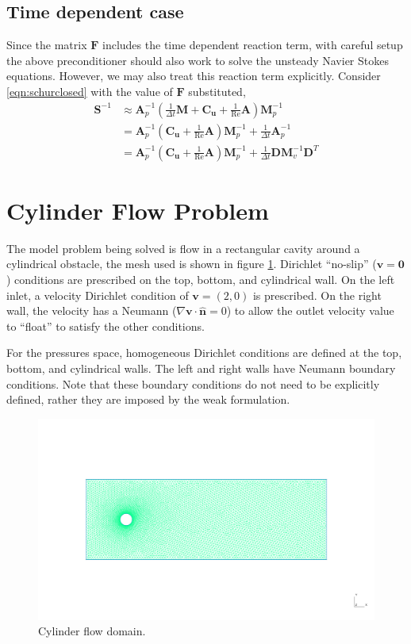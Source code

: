 \documentclass{article}
\newcommand{\mat}[1]{\bm{{#1}}}
\renewcommand{\vec}[1]{\bm{{#1}}}
\newcommand{\grad}{\nabla}
\renewcommand{\Re}{\text{Re}}
\begin{document}
\subsection{Time dependent case}
Since the matrix $\mat{F}$ includes the time dependent reaction term, with careful setup the above preconditioner should also work to solve the unsteady Navier Stokes equations.  However, we may also treat this reaction term explicitly.  Consider \eqref{eqn:schurclosed} with the value of $\mat{F}$ substituted,
\begin{align}
  \mat{S}^{-1} &\approx \mat{A}_p^{-1} \left(\frac{1}{\Delta t}\mat{M} + \mat{C}_{\vec{u}} + \frac{1}{\Re} \mat{A}\right)  \mat{M}_p^{-1} \\
               &= \mat{A}_p^{-1} \left(\mat{C}_{\vec{u}} + \frac{1}{\Re} \mat{A}\right)  \mat{M}_p^{-1} + \frac{1}{\Delta t}\mat{A}_p^{-1} \\
               &= \mat{A}_p^{-1} \left(\mat{C}_{\vec{u}} + \frac{1}{\Re} \mat{A}\right)  \mat{M}_p^{-1} + \frac{1}{\Delta t}\mat{DM}_v^{-1}\mat{D}^T \label{eqn:pcdrfinal}
\end{align}
\section{Cylinder Flow Problem}
The model problem being solved is flow in a rectangular cavity around a cylindrical obstacle, the mesh used is shown in figure \ref{fig:domain}.  Dirichlet ``no-slip'' ($\vec{v}=\vec{0}$) conditions are prescribed on the top, bottom, and cylindrical wall.  On the left inlet, a velocity Dirichlet condition of $\vec{v}=\left(2,0\right)$ is prescribed.  On the right wall, the velocity has a Neumann ($\grad\vec{v} \cdot \vec{\hat{n}} = 0$) to allow the outlet velocity value to ``float'' to satisfy the other conditions.

For the pressures space, homogeneous Dirichlet conditions are defined at the top, bottom, and cylindrical walls.  The left and right walls have Neumann boundary conditions.  Note that these boundary conditions do not need to be explicitly defined, rather they are imposed by the weak formulation.
\begin{figure}[h]
  \includegraphics[width=\textwidth]{figures/mesh_domain.pdf}
  \caption{Cylinder flow domain.}
  \label{fig:domain}
\end{figure}
\end{document}
